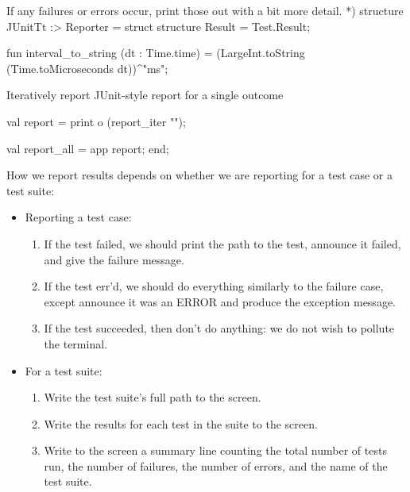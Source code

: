 If any failures or errors occur, print those out with a bit more
detail.
*)
structure JUnitTt :> Reporter = struct
structure Result = Test.Result;

fun interval_to_string (dt : Time.time) =
  (LargeInt.toString (Time.toMicroseconds dt))^"ms";

\LA{}Iteratively report JUnit-style report for a single outcome~{\nwtagstyle{}}\RA{}

val report = print o (report_iter "");

val report_all = app report;
end;
\nwendcode{}\nwdocspar

\begin{node}
How we report results depends on whether we are reporting for a test
case or a test suite:
\begin{itemize}
\item Reporting a test case:
\begin{enumerate}
\item If the test failed, we should print the path to the test, announce it failed, and give the failure message.
\item If the test err'd, we should do everything similarly to the failure case, except announce it was an ERROR and produce the exception message.
\item If the test succeeded, then don't do anything: we do not wish to pollute the terminal.
\end{enumerate}
\item For a test suite:
\begin{enumerate}
\item Write the test suite's full path to the screen.
\item Write the results for each test in the suite to the screen.
\item Write to the screen a summary line counting the total number of tests run, the number of failures, the number of errors, and the name of the test suite.
\end{enumerate}
\end{itemize}
\end{node}

